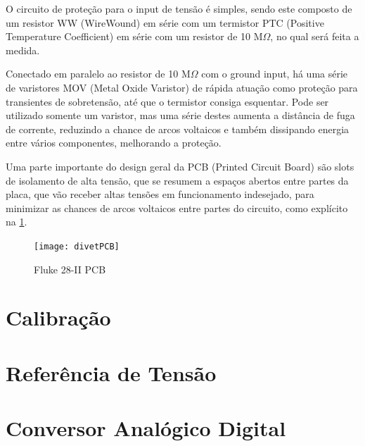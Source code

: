         O circuito de proteção para o input de tensão é simples, sendo este composto de um resistor WW (WireWound) em série com um termistor PTC (Positive Temperature Coefficient) em série com um resistor de 10 M$\Omega$, no qual será feita a medida. 

        Conectado em paralelo ao resistor de 10 M$\Omega$ com o ground input, há uma série de varistores MOV (Metal Oxide Varistor) de rápida atuação como proteção para transientes de sobretensão, até que o termistor consiga esquentar. Pode ser utilizado somente um varistor, mas uma série destes aumenta a distância de fuga de corrente, reduzindo a chance de arcos voltaicos e também dissipando energia entre vários componentes, melhorando a proteção.

        Uma parte importante do design geral da PCB (Printed Circuit Board) são slots de isolamento de alta tensão, que se resumem a espaços abertos entre partes da placa, que vão receber altas tensões em funcionamento indesejado, para minimizar as chances de arcos voltaicos entre partes do circuito, como explícito na \ref{fig:exemploPCB}. %

        \begin{figure}[htb]%
            \caption{Fluke 28-II PCB}%
            \label{fig:exemploPCB}%
            \texttt{[image: divetPCB]}%
        \end{figure}    








\section{Calibração}\label{sec:OpenLoopCalibration}

\section{Referência de Tensão}\label{sec:VoltageReference}

\section{Conversor Analógico Digital}\label{sec:ADC}

